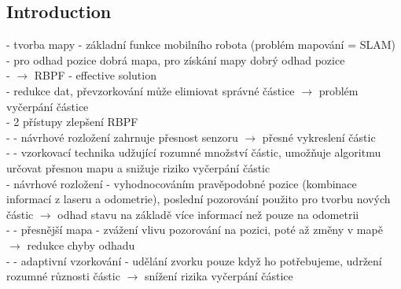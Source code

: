 \documentclass[11pt]{article}
\begin{document}
\subsection{Introduction}
- tvorba mapy - základní funkce mobilního robota (problém mapování = SLAM)\\
- pro odhad pozice dobrá mapa, pro získání mapy dobrý odhad pozice\\
- $\rightarrow$ RBPF - effective solution\\
- redukce dat, převzorkování může elimiovat správné částice $\rightarrow$ problém vyčerpání částice\\
- 2 přístupy zlepšení RBPF \\
- - návrhové rozložení zahrnuje přesnost senzoru $\rightarrow$ přesné vykreslení částic\\
- - vzorkovací technika udžující rozumné množství částic, umožňuje algoritmu určovat přesnou mapu a snižuje riziko vyčerpání částic\\
- návrhové rozložení - vyhodnocováním pravěpodobné pozice (kombinace informací z laseru a odometrie), poslední pozorování použito pro tvorbu nových částic $\rightarrow$ odhad stavu na základě více informací než pouze na odometrii \\
- - přesnější mapa - zvážení vlivu pozorování na pozici, poté až změny v mapě $\rightarrow$ redukce chyby odhadu\\
- - adaptivní vzorkování - udělání zvorku pouze když ho potřebujeme, udržení rozumné různosti částic $\rightarrow$ snížení rizika vyčerpání částice\\
\end{document}
